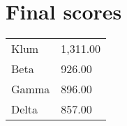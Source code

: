 \documentclass{article}
\begin{document}
\section*{Final scores}

\begin{center}
\begin{tabular}[t]{ll}
Klum & 1,311.00\\
Beta & 926.00\\
Gamma & 896.00\\
Delta & 857.00\\
\end{tabular}
\end{center}
\end{document}
